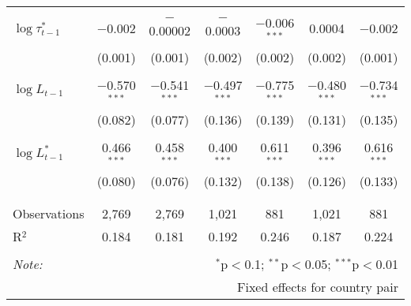 \begin{tabular}{@{\extracolsep{5pt}}lcccccc}
  & & & & & & \\ 
 $\log \tau_{t-1}^*$ & $-$0.002 & $-$0.00002 & $-$0.0003 & $-$0.006$^{***}$ & 0.0004 & $-$0.002 \\ 
  & (0.001) & (0.001) & (0.002) & (0.002) & (0.002) & (0.001) \\ 
  & & & & & & \\ 
 $\log L_{t-1}$ & $-$0.570$^{***}$ & $-$0.541$^{***}$ & $-$0.497$^{***}$ & $-$0.775$^{***}$ & $-$0.480$^{***}$ & $-$0.734$^{***}$ \\ 
  & (0.082) & (0.077) & (0.136) & (0.139) & (0.131) & (0.135) \\ 
  & & & & & & \\ 
 $\log L_{t-1}^*$ & 0.466$^{***}$ & 0.458$^{***}$ & 0.400$^{***}$ & 0.611$^{***}$ & 0.396$^{***}$ & 0.616$^{***}$ \\ 
  & (0.080) & (0.076) & (0.132) & (0.138) & (0.126) & (0.133) \\ 
  & & & & & & \\ 
\hline \\[-1.8ex] 
Observations & 2,769 & 2,769 & 1,021 & 881 & 1,021 & 881 \\ 
R$^{2}$ & 0.184 & 0.181 & 0.192 & 0.246 & 0.187 & 0.224 \\ 
\hline 
\hline \\[-1.8ex] 
\textit{Note:}  & \multicolumn{6}{r}{$^{*}$p$<$0.1; $^{**}$p$<$0.05; $^{***}$p$<$0.01} \\ 
 & \multicolumn{6}{r}{Fixed effects for country pair} \\ 
\end{tabular} 
